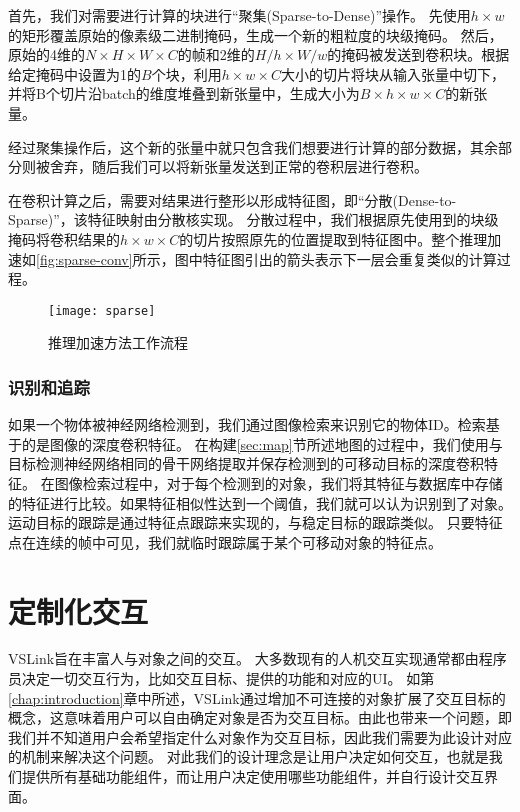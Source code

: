 首先，我们对需要进行计算的块进行“聚集(Sparse-to-Dense)”操作。
先使用$h\times w$的矩形覆盖原始的像素级二进制掩码，生成一个新的粗粒度的块级掩码。
然后，原始的4维的$N \times H \times W \times C$的帧和2维的$H/h \times W/w$的掩码被发送到卷积块。根据给定掩码中设置为1的$B$个块，利用$h\times w \times C$大小的切片将块从输入张量中切下，并将B个切片沿batch的维度堆叠到新张量中，生成大小为$B\times h \times w \times C$的新张量。

经过聚集操作后，这个新的张量中就只包含我们想要进行计算的部分数据，其余部分则被舍弃，随后我们可以将新张量发送到正常的卷积层进行卷积。

在卷积计算之后，需要对结果进行整形以形成特征图，即“分散(Dense-to-Sparse)”，该特征映射由分散核实现。
分散过程中，我们根据原先使用到的块级掩码将卷积结果的$h\times w \times C$的切片按照原先的位置提取到特征图中。整个推理加速如\autoref{fig:sparse-conv}所示，图中特征图引出的箭头表示下一层会重复类似的计算过程。

\begin{figure}[htb]
	\centering
	\texttt{[image: sparse]}
	\caption{推理加速方法工作流程}
	\label{fig:sparse-conv}
\end{figure}

\subsection{识别和追踪}
如果一个物体被神经网络检测到，我们通过图像检索来识别它的物体ID。检索基于的是图像的深度卷积特征。
在构建\ref{sec:map}节所述地图的过程中，我们使用与目标检测神经网络相同的骨干网络提取并保存检测到的可移动目标的深度卷积特征。
在图像检索过程中，对于每个检测到的对象，我们将其特征与数据库中存储的特征进行比较。如果特征相似性达到一个阈值，我们就可以认为识别到了对象。
运动目标的跟踪是通过特征点跟踪来实现的，与稳定目标的跟踪类似。
只要特征点在连续的帧中可见，我们就临时跟踪属于某个可移动对象的特征点。




\chapter{定制化交互}
\label{chap:flexible}

VSLink旨在丰富人与对象之间的交互。
大多数现有的人机交互实现通常都由程序员决定一切交互行为，比如交互目标、提供的功能和对应的UI。
如第\ref{chap:introduction}章中所述，VSLink通过增加不可连接的对象扩展了交互目标的概念，这意味着用户可以自由确定对象是否为交互目标。由此也带来一个问题，即我们并不知道用户会希望指定什么对象作为交互目标，因此我们需要为此设计对应的机制来解决这个问题。
对此我们的设计理念是让用户决定如何交互，也就是我们提供所有基础功能组件，而让用户决定使用哪些功能组件，并自行设计交互界面。






